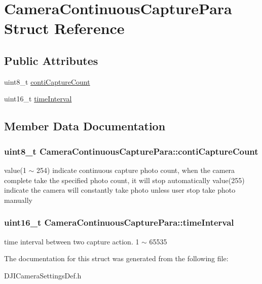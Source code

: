 \hypertarget{struct_camera_continuous_capture_para}{\section{Camera\+Continuous\+Capture\+Para Struct Reference}
\label{struct_camera_continuous_capture_para}
}
\subsection*{Public Attributes}
\begin{DoxyCompactItemize}
\item 
uint8\+\_\+t \hyperlink{struct_camera_continuous_capture_para_a9519a26ed852da0f133f17eb3de8d01e}{conti\+Capture\+Count}
\item 
uint16\+\_\+t \hyperlink{struct_camera_continuous_capture_para_af6166e497b7d802b8f9b487b401e8fc2}{time\+Interval}
\end{DoxyCompactItemize}


\subsection{Member Data Documentation}
\hypertarget{struct_camera_continuous_capture_para_a9519a26ed852da0f133f17eb3de8d01e}{
\subsubsection[{conti\+Capture\+Count}]{\setlength{\rightskip}{0pt plus 5cm}uint8\+\_\+t Camera\+Continuous\+Capture\+Para\+::conti\+Capture\+Count}}\label{struct_camera_continuous_capture_para_a9519a26ed852da0f133f17eb3de8d01e}
value(1 $\sim$ 254) indicate continuous capture photo count, when the camera complete take the specified photo count, it will stop automatically value(255) indicate the camera will constantly take photo unless user stop take photo manually \hypertarget{struct_camera_continuous_capture_para_af6166e497b7d802b8f9b487b401e8fc2}{
\subsubsection[{time\+Interval}]{\setlength{\rightskip}{0pt plus 5cm}uint16\+\_\+t Camera\+Continuous\+Capture\+Para\+::time\+Interval}}\label{struct_camera_continuous_capture_para_af6166e497b7d802b8f9b487b401e8fc2}
time interval between two capture action. 1 $\sim$ 65535 

The documentation for this struct was generated from the following file\+:\begin{DoxyCompactItemize}
\item 
D\+J\+I\+Camera\+Settings\+Def.\+h\end{DoxyCompactItemize}
